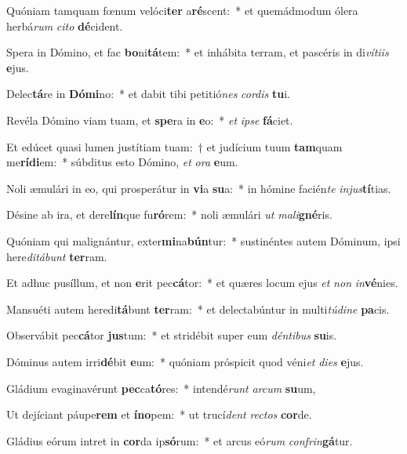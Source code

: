 \item Quóniam tamquam fœnum velóci\textbf{ter} a\textbf{ré}scent:~* et quemádmodum ólera herbá\textit{rum} \textit{ci}\textit{to} \textbf{dé}cident.
\item Spera in Dómino, et fac \textbf{bo}ni\textbf{tá}tem:~* et inhábita terram, et pascéris in di\textit{ví}\textit{ti}\textit{is} \textbf{e}jus.
\item Delec\textbf{tá}re in \textbf{Dó}\textbf{mi}no:~* et dabit tibi petitió\textit{nes} \textit{cor}\textit{dis} \textbf{tu}i.
\item Revéla Dómino viam tuam, et \textbf{spe}ra in \textbf{e}o:~* \textit{et} \textit{ip}\textit{se} \textbf{fá}ciet.
\item Et edúcet quasi lumen justítiam tuam:~† et judícium tuum \textbf{tam}quam me\textbf{rí}\textbf{di}em:~* súbditus esto Dómino, \textit{et} \textit{o}\textit{ra} \textbf{e}um.
\item Noli æmulári in eo, qui prosperátur in \textbf{vi}a \textbf{su}a:~* in hómine facién\textit{te} \textit{in}\textit{jus}\textbf{tí}tias.
\item Désine ab ira, et dere\textbf{lín}que fu\textbf{ró}rem:~* noli æmulári \textit{ut} \textit{ma}\textit{li}\textbf{gné}ris.
\item Quóniam qui malignántur, exter\textbf{mi}na\textbf{bún}tur:~* sustinéntes autem Dóminum, ipsi here\textit{di}\textit{tá}\textit{bunt} \textbf{ter}ram.
\item Et adhuc pusíllum, et non \textbf{e}rit pec\textbf{cá}tor:~* et quæres locum ejus \textit{et} \textit{non} \textit{in}\textbf{vé}nies.
\item Mansuéti autem heredi\textbf{tá}bunt \textbf{ter}ram:~* et delectabúntur in multi\textit{tú}\textit{di}\textit{ne} \textbf{pa}cis.
\item Observábit pec\textbf{cá}tor \textbf{jus}tum:~* et stridébit super eum \textit{dén}\textit{ti}\textit{bus} \textbf{su}is.
\item Dóminus autem irri\textbf{dé}bit \textbf{e}um:~* quóniam próspicit quod véni\textit{et} \textit{di}\textit{es} \textbf{e}jus.
\item Gládium evaginavérunt \textbf{pec}ca\textbf{tó}res:~* intendé\textit{runt} \textit{ar}\textit{cum} \textbf{su}um,
\item Ut dejíciant páupe\textbf{rem} et \textbf{ín}\textbf{o}pem:~* ut trucí\textit{dent} \textit{rec}\textit{tos} \textbf{cor}de.
\item Gládius eórum intret in \textbf{cor}da ip\textbf{só}rum:~* et arcus eó\textit{rum} \textit{con}\textit{frin}\textbf{gá}tur.
